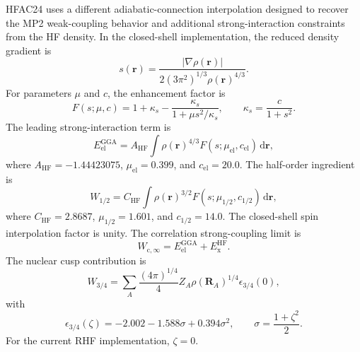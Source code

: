 \documentclass[aip,jcp,reprint,superscriptaddress]{revtex4-2}
\newcommand{\dd}{\mathrm{d}}
\newcommand{\ExHF}{E_{\mathrm{x}}^{\mathrm{HF}}}
\newcommand{\Wcinf}{W_{\mathrm{c},\infty}}
\newcommand{\Whalf}{W_{1/2}}
\newcommand{\Wthreeq}{W_{3/4}}
\begin{document}
HFAC24 uses a different adiabatic-connection interpolation designed to recover the MP2 weak-coupling behavior and additional strong-interaction constraints from the HF density.\cite{HFAC24}  In the closed-shell implementation, the reduced density gradient is
\begin{equation}
  s(\mathbf{r})
  =
  \frac{|\nabla\rho(\mathbf{r})|}
       {2(3\pi^2)^{1/3}\rho(\mathbf{r})^{4/3}}.
\end{equation}
For parameters \(\mu\) and \(c\), the enhancement factor is
\begin{equation}
  F(s;\mu,c)
  =
  1+\kappa_s-\frac{\kappa_s}{1+\mu s^2/\kappa_s},
  \qquad
  \kappa_s=\frac{c}{1+s^2}.
  \label{eq:hfac_enhancement}
\end{equation}
The leading strong-interaction term is
\begin{equation}
  E_{\mathrm{el}}^{\mathrm{GGA}}
  =
  A_{\mathrm{HF}}
  \int
  \rho(\mathbf{r})^{4/3}
  F(s;\mu_{\mathrm{el}},c_{\mathrm{el}})
  \,\dd\mathbf{r},
\end{equation}
where \(A_{\mathrm{HF}}=-1.44423075\), \(\mu_{\mathrm{el}}=0.399\), and \(c_{\mathrm{el}}=20.0\).  The half-order ingredient is
\begin{equation}
  \Whalf
  =
  C_{\mathrm{HF}}
  \int
  \rho(\mathbf{r})^{3/2}
  F(s;\mu_{1/2},c_{1/2})
  \,\dd\mathbf{r},
\end{equation}
where \(C_{\mathrm{HF}}=2.8687\), \(\mu_{1/2}=1.601\), and \(c_{1/2}=14.0\).  The closed-shell spin interpolation factor is unity.  The correlation strong-coupling limit is
\begin{equation}
  \Wcinf = E_{\mathrm{el}}^{\mathrm{GGA}}+\ExHF .
\end{equation}
The nuclear cusp contribution is
\begin{equation}
  \Wthreeq
  =
  \sum_A
  \frac{(4\pi)^{1/4}}{4}
  Z_A\rho(\mathbf{R}_A)^{1/4}
  \epsilon_{3/4}(0),
\end{equation}
with
\begin{equation}
  \epsilon_{3/4}(\zeta)
  =
  -2.002-1.588\sigma+0.394\sigma^2,
  \qquad
  \sigma=\frac{1+\zeta^2}{2}.
\end{equation}
For the current RHF implementation, \(\zeta=0\).
\end{document}
